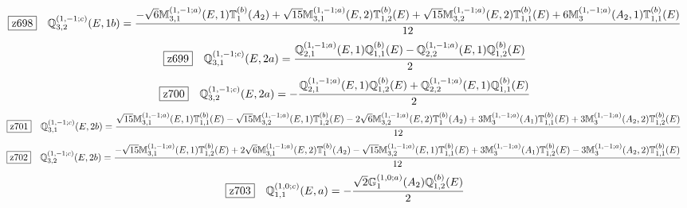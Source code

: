 \documentclass[fleqn,10pt,landscape]{jsarticle}
\begin{document}
\begin{dmath*}
\hspace*{3mm}\fbox{z698}\quad \mathbb{Q}_{3,2}^{(1,-1;c)}(E,1b)=\frac{- \sqrt{6} \mathbb{M}_{3,1}^{(1,-1;a)}(E,1) \mathbb{T}_{1}^{(b)}(A_{2}) + \sqrt{15} \mathbb{M}_{3,1}^{(1,-1;a)}(E,2) \mathbb{T}_{1,2}^{(b)}(E) + \sqrt{15} \mathbb{M}_{3,2}^{(1,-1;a)}(E,2) \mathbb{T}_{1,1}^{(b)}(E) + 6 \mathbb{M}_{3}^{(1,-1;a)}(A_{2},1) \mathbb{T}_{1,1}^{(b)}(E)}{12}
\end{dmath*}
\begin{dmath*}
\hspace*{3mm}\fbox{z699}\quad \mathbb{Q}_{3,1}^{(1,-1;c)}(E,2a)=\frac{\mathbb{Q}_{2,1}^{(1,-1;a)}(E,1) \mathbb{Q}_{1,1}^{(b)}(E) - \mathbb{Q}_{2,2}^{(1,-1;a)}(E,1) \mathbb{Q}_{1,2}^{(b)}(E)}{2}
\end{dmath*}
\begin{dmath*}
\hspace*{3mm}\fbox{z700}\quad \mathbb{Q}_{3,2}^{(1,-1;c)}(E,2a)=- \frac{\mathbb{Q}_{2,1}^{(1,-1;a)}(E,1) \mathbb{Q}_{1,2}^{(b)}(E) + \mathbb{Q}_{2,2}^{(1,-1;a)}(E,1) \mathbb{Q}_{1,1}^{(b)}(E)}{2}
\end{dmath*}
\begin{dmath*}
\hspace*{3mm}\fbox{z701}\quad \mathbb{Q}_{3,1}^{(1,-1;c)}(E,2b)=\frac{\sqrt{15} \mathbb{M}_{3,1}^{(1,-1;a)}(E,1) \mathbb{T}_{1,1}^{(b)}(E) - \sqrt{15} \mathbb{M}_{3,2}^{(1,-1;a)}(E,1) \mathbb{T}_{1,2}^{(b)}(E) - 2 \sqrt{6} \mathbb{M}_{3,2}^{(1,-1;a)}(E,2) \mathbb{T}_{1}^{(b)}(A_{2}) + 3 \mathbb{M}_{3}^{(1,-1;a)}(A_{1}) \mathbb{T}_{1,1}^{(b)}(E) + 3 \mathbb{M}_{3}^{(1,-1;a)}(A_{2},2) \mathbb{T}_{1,2}^{(b)}(E)}{12}
\end{dmath*}
\begin{dmath*}
\hspace*{3mm}\fbox{z702}\quad \mathbb{Q}_{3,2}^{(1,-1;c)}(E,2b)=\frac{- \sqrt{15} \mathbb{M}_{3,1}^{(1,-1;a)}(E,1) \mathbb{T}_{1,2}^{(b)}(E) + 2 \sqrt{6} \mathbb{M}_{3,1}^{(1,-1;a)}(E,2) \mathbb{T}_{1}^{(b)}(A_{2}) - \sqrt{15} \mathbb{M}_{3,2}^{(1,-1;a)}(E,1) \mathbb{T}_{1,1}^{(b)}(E) + 3 \mathbb{M}_{3}^{(1,-1;a)}(A_{1}) \mathbb{T}_{1,2}^{(b)}(E) - 3 \mathbb{M}_{3}^{(1,-1;a)}(A_{2},2) \mathbb{T}_{1,1}^{(b)}(E)}{12}
\end{dmath*}
\begin{dmath*}
\hspace*{3mm}\fbox{z703}\quad \mathbb{Q}_{1,1}^{(1,0;c)}(E,a)=- \frac{\sqrt{2} \mathbb{G}_{1}^{(1,0;a)}(A_{2}) \mathbb{Q}_{1,2}^{(b)}(E)}{2}
\end{dmath*}
\end{document}
